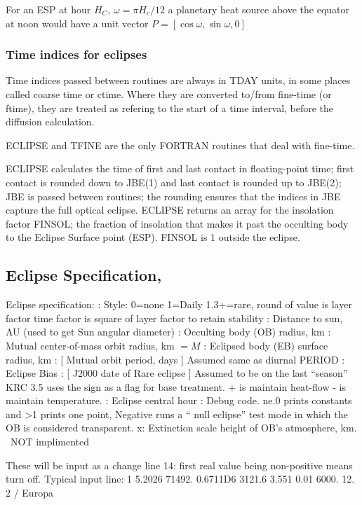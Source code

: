 \documentclass{article}
\begin{document}
For an ESP at hour $H_C$, $\omega=\pi H_c/12$ a planetary heat source above the
equator at noon would have a unit vector $P=[\cos \omega, \sin \omega, 0]$

\subsubsection{Time indices for eclipses}

Time indices passed between routines are always in TDAY units, in some places
called coarse time or ctime. Where they are converted to/from fine-time (or
ftime), they are treated as refering to the start of a time interval, before the
diffusion calculation.

ECLIPSE and TFINE are the only FORTRAN routines that deal with fine-time.

ECLIPSE calculates the time of first and last contact in floating-point time;
first contact is rounded down to JBE(1) and last contact is rounded up to
JBE(2); JBE is passed between routines; the rounding ensures that the indices in
JBE capture the full optical eclipse. ECLIPSE returns an array for the
insolation factor FINSOL; the fraction of insolation that makes it past the
occulting body to the Eclipse Surface point (ESP).  FINSOL is 1 outside the
eclipse.

\subsection{Eclipse Specification, \label{eline}}

Eclipse specification: 
:  Style: 0=none  1=Daily  1.3+=rare, round of value is layer factor
\qii time factor is square of layer factor to retain stability
:  Distance to sun,  AU (used to get  Sun angular diameter)
:  Occulting body (OB) radius, km
:  Mutual center-of-mass orbit radius, km $=M$
:  Eclipsed body (EB) surface radius, km
:  [ Mutual orbit period, days ] Assumed same as diurnal PERIOD
:  Eclipse Bias
:  [ J2000 date of Rare eclipse ] Assumed to be on the last ``season''
\qii KRC 3.5 uses the sign as a flag for base treatment. + is maintain heat-flow
 - is maintain temperature. 
:  Eclipse central hour
:  Debug code.  ne.0 prints constants and >1 prints one point,
\qii Negative runs a `` null eclipse'' test mode in which the OB is considered transparent.
\qi x:  Extinction scale height of  OB's atmosphere, km. \  NOT implimented 

These will be input as a change line 14: first real value being non-positive means turn off.  Typical input line: 
  1 5.2026 71492. 0.6711D6 3121.6 3.551 0.01 6000. 12.  2 / Europa
\end{document}

